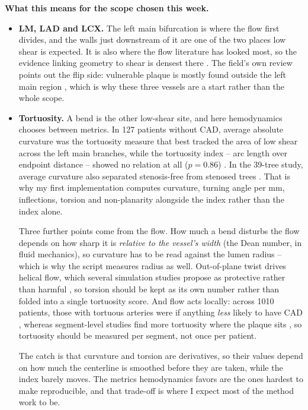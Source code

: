 \textbf{What this means for the scope chosen this week.}
\begin{itemize}
  \item \textbf{LM, LAD and LCX.} The left main bifurcation is where the flow first divides, and the
    walls just downstream of it are one of the two places low shear is expected. It is also where the
    flow literature has looked most, so the evidence linking geometry to shear is densest there
    \cite{kashyap2022tortuosity, zhang2024curvature}. The field's own review points out the flip
    side: vulnerable plaque is mostly found outside the left main region \cite{shen2026geometry},
    which is why these three vessels are a start rather than the whole scope.

  \item \textbf{Tortuosity.} A bend is the other low-shear site, and here hemodynamics chooses
    between metrics. In 127 patients without CAD, average absolute curvature was the tortuosity
    measure that best tracked the area of low shear across the left main branches, while the
    tortuosity index -- arc length over endpoint distance -- showed no relation at all ($p=0.86$)
    \cite{kashyap2022tortuosity}. In the 39-tree study, average curvature also separated
    stenosis-free from stenosed trees \cite{zhang2024curvature}. That is why my first implementation
    computes curvature, turning angle per mm, inflections, torsion and non-planarity alongside the
    index rather than the index alone.

    Three further points come from the flow. How much a bend disturbs the flow depends on how sharp
    it is \emph{relative to the vessel's width} (the Dean number, in fluid mechanics), so curvature
    has to be read against the lumen radius -- which is why the script measures radius as well.
    Out-of-plane twist drives helical flow, which several simulation studies propose as protective
    rather than harmful \cite{shen2026geometry}, so torsion should be kept as its own number rather
    than folded into a single tortuosity score. And flow acts locally: across 1010 patients, those
    with tortuous arteries were if anything \emph{less} likely to have CAD \cite{li2011tortuosity},
    whereas segment-level studies find more tortuosity where the plaque sits \cite{shen2026geometry},
    so tortuosity should be measured per segment, not once per patient.

    The catch is that curvature and torsion are derivatives, so their values depend on how much the
    centerline is smoothed before they are taken, while the index barely moves. The metrics
    hemodynamics favors are the ones hardest to make reproducible, and that trade-off is where I
    expect most of the method work to be.


\end{itemize}
